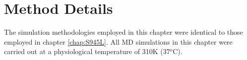 

\section{Method Details}
The simulation methodologies employed in this chapter were identical to those employed in chapter \ref{chap:S945L}. All MD simulations in this chapter were carried out at a physiological temperature of 310K (37$^o$C).
